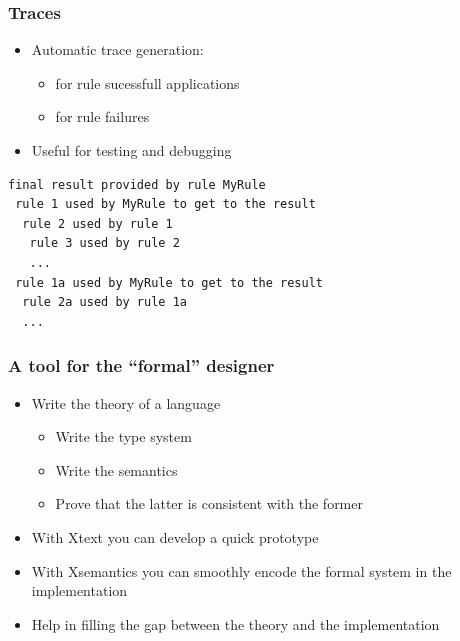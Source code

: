 \begin{frame}[fragile]
\frametitle{Traces}

\begin{itemize}
  \item Automatic trace generation:
  \begin{itemize}
    \item for rule sucessfull applications
    \item for rule failures
  \end{itemize}
  \item Useful for testing and debugging
\end{itemize}

\medskip

\begin{footnotesize}
\begin{verbatim}
final result provided by rule MyRule
 rule 1 used by MyRule to get to the result
  rule 2 used by rule 1
   rule 3 used by rule 2
   ...
 rule 1a used by MyRule to get to the result
  rule 2a used by rule 1a
  ...
\end{verbatim}
\end{footnotesize}

\end{frame}

\begin{frame}
\frametitle{A tool for the ``formal'' designer}

\begin{itemize}
  \item Write the theory of a language
  \begin{itemize}
    \item Write the type system
    \item Write the semantics
    \item Prove that the latter is consistent with the former
  \end{itemize}   
  \item With Xtext you can develop a quick prototype
  \item With Xsemantics you can smoothly encode the formal system
  in the implementation
  \item Help in filling the gap between the theory and the implementation
\end{itemize}

\end{frame}